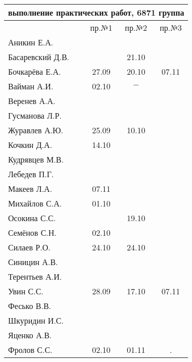 \documentclass[a4paper,landscape,11pt]{article}
\begin{document}
\begin{tabular}{l|ccc}
\multicolumn{4}{c}{выполнение практических работ, 6871 группа} \\
\toprule
& пр.№1 & пр.№2  &  пр.№3 \\
\midrule
Аникин Е.А.     &     &     &\\    
Басаревский Д.В.&     &21.10&\\
Бочкарёва Е.А.  &27.09&20.10&07.11\\
Вайман А.И.     &02.10&$-$  &\\
Веренев А.А.    &     &     &\\
Гусманова Л.Р.  &     &     &\\
Журавлев А.Ю.   &25.09&10.10&\\
Кочкин Д.А.     &14.10&     &\\
Кудрявцев М.В.  &     &     &\\
Лебедев П.Г.    &     &     &\\
Макеев Л.А.     &07.11&     &\\
Михайлов С.А.   &01.10&     &\\
Осокина С.С.    &     &19.10&\\
Семёнов С.Н.    &02.10&     &\\
Силаев Р.О.     &24.10&24.10&\\
Синицин А.В.    &     &     &\\
Терентьев А.И.  &     &     &\\
Увин С.С.       &28.09&17.10&07.11\\
Фесько В.В.     &     &     &\\
Шкуридин И.С.   &     &     &\\
Яценко А.В.     &     &     &\\
Фролов С.С.     &02.10&01.11& .\\
\bottomrule
\end{tabular}
\end{document}
